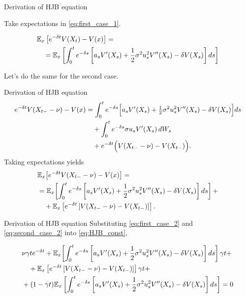 \documentclass{beamer}
\theoremstyle{definition}
\newcommand{\E}{\mathbb{E}}
\begin{document}
\begin{frame}{Derivation of HJB equation}

Take expectations in \eqref{eq:first_case_1}.

\begin{align}
    &\E_x\left[e^{-\delta t}V(X_t) - V(x)\right] = \notag \\
    & \quad = \E_x\left[\int_0^t e^{-\delta s}
        \left[a_s V'(X_s)
        + \frac{1}{2}\sigma^2 u_s^2 V''(X_s)
        - \delta V(X_s)\right]ds\right]
    \label{eq:first_case_2}
\end{align}

Let's do the same for the second case.

\end{frame}

\begin{frame}{Derivation of HJB equation}
\begin{align}
e^{-\delta t}V(X_{t-} - \nu) - V(x)
&= \int_0^t e^{-\delta s}
\Big[
a_s V'(X_s)
+ \tfrac{1}{2}\sigma^2 u_s^2 V''(X_s)
- \delta V(X_s)
\Big] ds \notag \\
&\quad + \int_0^t e^{-\delta s}
\sigma u_s V'(X_s)\, dW_s \notag \\
&\quad + e^{-\delta t}
\Big(
V(X_{t-}-\nu)-V(X_{t-})
\Big).
\label{eq:second_case_1}
\end{align}
Taking expectations yields
\begin{align}
&\E_x \!\left[e^{-\delta t}V(X_{t-}-\nu)-V(x)\right] = \notag \\
&= \E_x \!\left[\int_0^t e^{-\delta s}
    \left[a_s V'(X_s) + \frac{1}{2} \sigma^2 u_s^2 V''(X_s) - \delta V(X_s)\right] ds \right] + \notag \\
&\quad + \E_x\left[e^{-\delta t}\left[ V(X_{t-}-\nu) - V(X_{t-})\right] \right].
\label{eq:second_case_2}
\end{align}
\end{frame}

\begin{frame}{Derivation of HJB equation}
Substituting \eqref{eq:first_case_2} and \eqref{eq:second_case_2} into \eqref{eq:HJB_const},

\begin{align}
    &\nu\gamma t e^{-\delta t} + \E_x \!\left[\int_0^t e^{-\delta s}
    \left[a_s V'(X_s) + \frac{1}{2} \sigma^2 u^2_s V''(X_s) - \delta V(X_s)\right] ds \right]\gamma t + \notag \\
    &\quad + \E_x \left[e^{-\delta t}\left[ V(X_{t-}-\nu) - V(X_{t-})\right]\right] \gamma t +  \notag \\
    & + (1 - \gamma t) \E_x\left[\int_0^t e^{-\delta s}
        \left[a_s V'(X_s)
        + \frac{1}{2}\sigma^2 u_s^2 V''(X_s)
        - \delta V(X_s)\right]ds\right] = 0
    \label{eq:done}
\end{align}

\end{frame}
\end{document}
